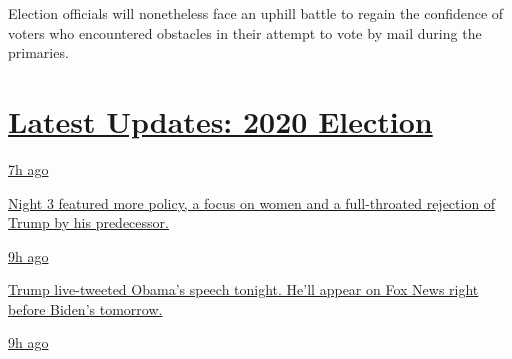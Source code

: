 Election officials will nonetheless face an uphill battle to regain the
confidence of voters who encountered obstacles in their attempt to vote
by mail during the primaries.

\hypertarget{latest-updates-2020-election}{%
\section{\texorpdfstring{\href{https://www.nytimes3xbfgragh.onion/live/2020/08/19/us/dnc-convention-election?action=click\&pgtype=Article\&state=default\&region=MAIN_CONTENT_1\&context=storylines_live_updates}{Latest
Updates: 2020
Election}}{Latest Updates: 2020 Election}}\label{latest-updates-2020-election}}

\href{https://www.nytimes3xbfgragh.onion/live/2020/08/19/us/dnc-convention-election?action=click\&pgtype=Article\&state=default\&region=MAIN_CONTENT_1\&context=storylines_live_updates\#night-3-featured-more-policy-a-focus-on-women-and-a-full-throated-rejection-of-trump-by-his-predecessor}{7h
ago}

\href{https://www.nytimes3xbfgragh.onion/live/2020/08/19/us/dnc-convention-election?action=click\&pgtype=Article\&state=default\&region=MAIN_CONTENT_1\&context=storylines_live_updates\#night-3-featured-more-policy-a-focus-on-women-and-a-full-throated-rejection-of-trump-by-his-predecessor}{Night
3 featured more policy, a focus on women and a full-throated rejection
of Trump by his predecessor.}

\href{https://www.nytimes3xbfgragh.onion/live/2020/08/19/us/dnc-convention-election?action=click\&pgtype=Article\&state=default\&region=MAIN_CONTENT_1\&context=storylines_live_updates\#trump-live-tweeted-obamas-speech-tonight-hell-appear-on-fox-news-right-before-bidens-tomorrow}{9h
ago}

\href{https://www.nytimes3xbfgragh.onion/live/2020/08/19/us/dnc-convention-election?action=click\&pgtype=Article\&state=default\&region=MAIN_CONTENT_1\&context=storylines_live_updates\#trump-live-tweeted-obamas-speech-tonight-hell-appear-on-fox-news-right-before-bidens-tomorrow}{Trump
live-tweeted Obama's speech tonight. He'll appear on Fox News right
before Biden's tomorrow.}

\href{https://www.nytimes3xbfgragh.onion/live/2020/08/19/us/dnc-convention-election?action=click\&pgtype=Article\&state=default\&region=MAIN_CONTENT_1\&context=storylines_live_updates\#advocates-for-domestic-violence-survivors-praised-biden-in-a-video}{9h
ago}

